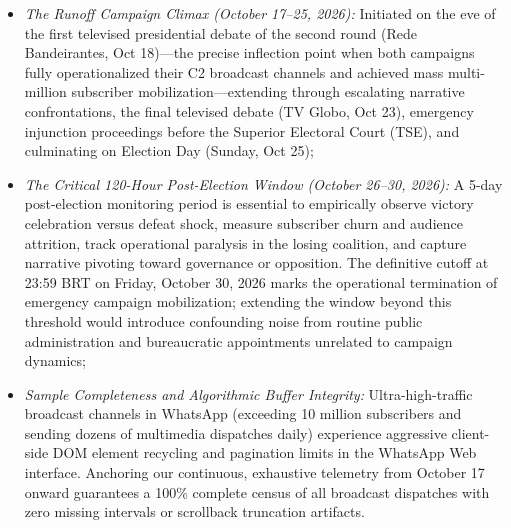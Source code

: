 \documentclass[preprint,12pt]{elsarticle}
\begin{document}
\begin{itemize}
    \item \textit{The Runoff Campaign Climax (October 17--25, 2026):} Initiated on the eve of the first televised presidential debate of the second round (Rede Bandeirantes, Oct 18)---the precise inflection point when both campaigns fully operationalized their C2 broadcast channels and achieved mass multi-million subscriber mobilization---extending through escalating narrative confrontations, the final televised debate (TV Globo, Oct 23), emergency injunction proceedings before the Superior Electoral Court (TSE), and culminating on Election Day (Sunday, Oct 25);
    \item \textit{The Critical 120-Hour Post-Election Window (October 26--30, 2026):} A 5-day post-election monitoring period is essential to empirically observe victory celebration versus defeat shock, measure subscriber churn and audience attrition, track operational paralysis in the losing coalition, and capture narrative pivoting toward governance or opposition. The definitive cutoff at 23:59 BRT on Friday, October 30, 2026 marks the operational termination of emergency campaign mobilization; extending the window beyond this threshold would introduce confounding noise from routine public administration and bureaucratic appointments unrelated to campaign dynamics;
    \item \textit{Sample Completeness and Algorithmic Buffer Integrity:} Ultra-high-traffic broadcast channels in WhatsApp (exceeding 10 million subscribers and sending dozens of multimedia dispatches daily) experience aggressive client-side DOM element recycling and pagination limits in the WhatsApp Web interface. Anchoring our continuous, exhaustive telemetry from October 17 onward guarantees a 100\% complete census of all broadcast dispatches with zero missing intervals or scrollback truncation artifacts.
\end{itemize}
\end{document}
